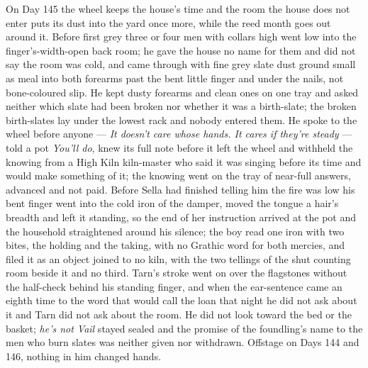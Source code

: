 \documentclass{design/chronicle}
\begin{document}
{On Day 145 the wheel keeps the house’s time and the room the house does not enter puts its dust into the yard once more, while the reed month goes out around it. Before first grey three or four men with collars high went low into the finger’s-width-open back room; he gave the house no name for them and did not say the room was cold, and came through with fine grey slate dust ground small as meal into both forearms past the bent little finger and under the nails, not bone-coloured slip. He kept dusty forearms and clean ones on one tray and asked neither which slate had been broken nor whether it was a birth-slate; the broken birth-slates lay under the lowest rack and nobody entered them. He spoke to the wheel before anyone — \emph{It doesn’t care whose hands. It cares if they’re steady} — told a pot \emph{You’ll do}, knew its full note before it left the wheel and withheld the knowing from a High Kiln kiln-master who said it was singing before its time and would make something of it; the knowing went on the tray of near-full answers, advanced and not paid. Before Sella had finished telling him the fire was low his bent finger went into the cold iron of the damper, moved the tongue a hair’s breadth and left it standing, so the end of her instruction arrived at the pot and the household straightened around his silence; the boy read one iron with two bites, the holding and the taking, with no Grathic word for both mercies, and filed it as an object joined to no kiln, with the two tellings of the shut counting room beside it and no third. Tarn’s stroke went on over the flagstones without the half-check behind his standing finger, and when the ear-sentence came an eighth time to the word that would call the loan that night he did not ask about it and Tarn did not ask about the room. He did not look toward the bed or the basket; \emph{he’s not Vail} stayed sealed and the promise of the foundling’s name to the men who burn slates was neither given nor withdrawn. Offstage on Days 144 and 146, nothing in him changed hands.

}
\end{document}

